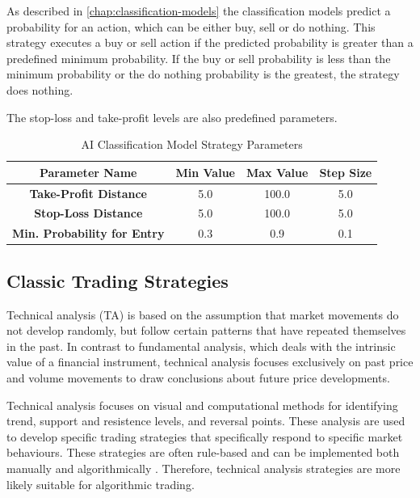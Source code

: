 As described in \autoref{chap:classification-models} the classification models predict a probability for an action, which can be either buy, sell or do nothing.
This strategy executes a buy or sell action if the predicted probability is greater than a predefined minimum probability.
If the buy or sell probability is less than the minimum probability or the do nothing probability is the greatest, the strategy does nothing.

The stop-loss and take-profit levels are also predefined parameters.

\begin{table}[H]
    \centering
    \begin{tabular}{cccc}
        \toprule
        Parameter Name & Min Value & Max Value & Step Size
        \\
        \midrule
        \textbf{Take-Profit Distance}       & 5.0 & 100.0 & 5.0 \\
        \textbf{Stop-Loss Distance}         & 5.0 & 100.0 & 5.0 \\
        \textbf{Min. Probability for Entry} & 0.3 & 0.9   & 0.1 \\
        \bottomrule
    \end{tabular}
    \caption{AI Classification Model Strategy Parameters}
    \label{tbl:classification-strategy-parameters}
\end{table}

\subsection{Classic Trading Strategies}

Technical analysis (TA) is based on the assumption that market movements do not develop randomly, but follow certain patterns that have repeated themselves in the past.
In contrast to fundamental analysis, which deals with the intrinsic value of a financial instrument, technical analysis focuses exclusively on past price and volume movements to draw conclusions about future price developments.

Technical analysis focuses on visual and computational methods for identifying trend, support and resistence levels, and reversal points.
These analysis are used to develop specific trading strategies that specifically respond to specific market behaviours.
These strategies are often rule-based and can be implemented both manually and algorithmically \cite{ta-basics}.
Therefore, technical analysis strategies are more likely suitable for algorithmic trading.

